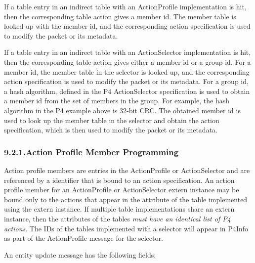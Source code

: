\documentclass[11pt]{article}
\begin{document}
{%
If a table entry in an indirect table with an ActionProfile implementation is
hit, then the corresponding table action gives a member id. The member table is
looked up with the member id, and the corresponding action specification is used
to modify the packet or its metadata.%

If a table entry in an indirect table with an ActionSelector implementation is
hit, then the corresponding table action gives either a member id or a group
id. For a member id, the member table in the selector is looked up, and the
corresponding action specification is used to modify the packet or its
metadata. For a group id, a hash algorithm, defined in the P4 ActionSelector
specification is used to obtain a member id from the set of members in the
group. For example, the hash algorithm in the P4 example above is 32-bit CRC.
The obtained member id is used to look up the member table in the selector and
obtain the action specification, which is then used to modify the packet or its
metadata.%

\subsubsection{9.2.1.\hspace*{0.5em}Action Profile Member Programming}\label{sec-action-profile-member-programming}%

\noindent{}Action profile members are entries in the ActionProfile or ActionSelector and
are referenced by a  identifier that is bound to an action
specification. An action profile member for an ActionProfile or ActionSelector
extern instance may be bound only to the actions that appear in the 
attribute of the table implemented using the extern instance. If multiple table
implementations share an extern instance, then the  attributes of the
tables \emph{must have an identical list of P4 actions}. The IDs of the tables
implemented with a selector will appear in P4Info as part of the ActionProfile
message for the selector.%

An  entity update message has the following fields:%

}
\end{document}
